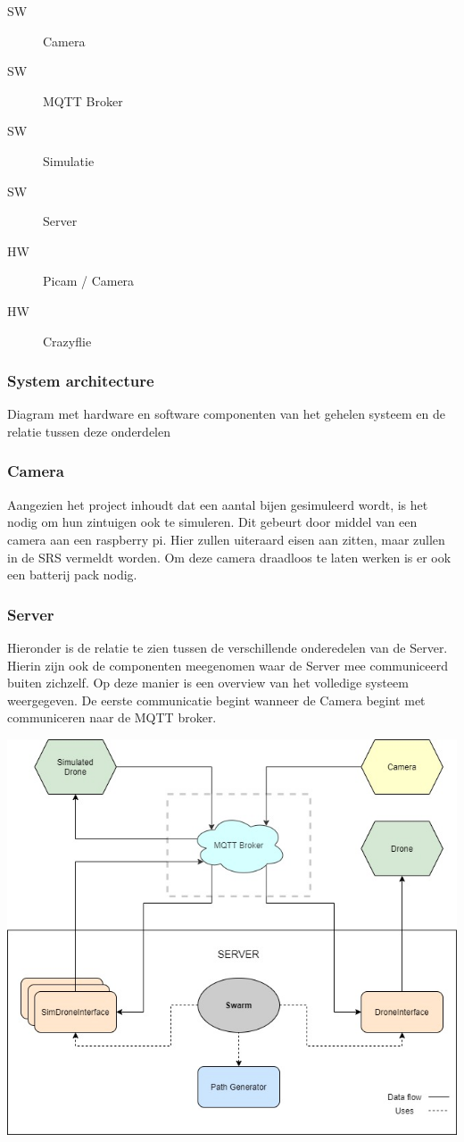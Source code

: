 \begin{description}
    \item[SW] Camera
    \item[SW] MQTT Broker
    \item[SW] Simulatie
    \item[SW] Server
    \item[HW] Picam / Camera
    \item[HW] Crazyflie
\end{description}

\subsubsection{System architecture}
Diagram met hardware en software componenten van het gehelen systeem en de relatie tussen deze onderdelen
\subsubsection*{Camera}
Aangezien het project inhoudt dat een aantal bijen gesimuleerd wordt, is het nodig om hun zintuigen ook te simuleren. Dit gebeurt door middel van een camera aan een raspberry pi. Hier zullen uiteraard eisen aan zitten, maar zullen in de SRS vermeldt worden. Om deze camera draadloos te laten werken is er ook een batterij pack nodig.

\subsubsection*{Server}
Hieronder is de relatie te zien tussen de verschillende onderedelen van de Server. Hierin zijn ook de componenten meegenomen waar de Server mee communiceerd buiten zichzelf. Op deze manier is een overview van het volledige systeem weergegeven.
De eerste communicatie begint wanneer de Camera begint met communiceren naar de MQTT broker.
\begin{center}
    \includegraphics[scale=0.5]{../IMAGES/ServerV3.jpg}
\end{center}




